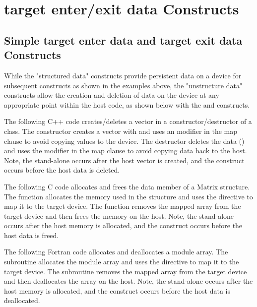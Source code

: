 \pagebreak
\chapter{target enter/exit data Constructs}
\label{chap:target_enter_exit_data}
\section{Simple target enter data and target exit data Constructs}
While the "structured data" constructs provide persistent data on a 
device for subsequent  constructs as shown in the 
 examples above, the "unstructure data" constructs 
allow the creation and deletion of data on the device at any appropriate
point within the host code, as shown below with the  
and  constructs.

The following C++ code creates/deletes a vector in a constructor/destructor 
of a class. The constructor creates a vector with 
and uses an  modifier in the map clause to avoid copying values
to the device. The destructor deletes the data ()
and uses the  modifier in the map clause to avoid copying data
back to the host. Note, the stand-alone  occurs 
after the host vector is created, and the 
construct occurs before the host data is deleted.

The following C code allocates and frees the data member of a Matrix structure.
The  function allocates the memory used in the structure and
uses the  directive to map it to the target device. The
 function removes the mapped array from the target device
and then frees the memory on the host.  Note, the stand-alone  occurs after the host memory is allocated, and the  construct occurs before the host data is freed.

The following Fortran code allocates and deallocates a module array.  The
 subroutine allocates the module array and uses the
 directive to map it to the target device. The
 subroutine removes the mapped array from the target device and
then deallocates the array on the host.  Note, the stand-alone  occurs after the host memory is allocated, and the  construct occurs before the host data is deallocated.

